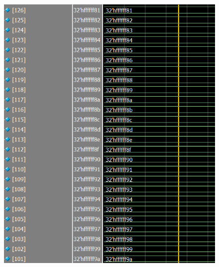 \documentclass[conference]{IEEEtran}
\begin{document}
	\begin{figure}[H]
		\centering
		\includegraphics[width=\columnwidth]{Files/full_mem_val5}
		\caption{}
		\label{fig:fullmemval5}
	\end{figure}
	
\end{document}
